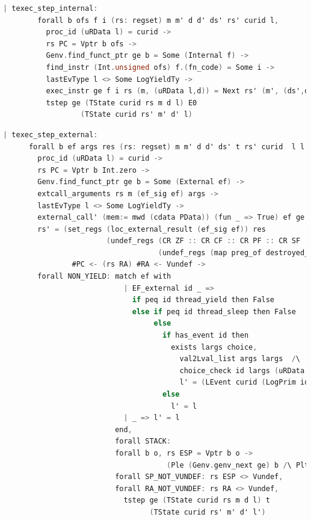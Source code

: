 \begin{lstlisting}[language=C]
    | texec_step_internal:
        forall b ofs f i (rs: regset) m m' d d' ds' rs' curid l,
          proc_id (uRData l) = curid ->
          rs PC = Vptr b ofs ->
          Genv.find_funct_ptr ge b = Some (Internal f) ->
          find_instr (Int.unsigned ofs) f.(fn_code) = Some i ->
          lastEvType l <> Some LogYieldTy ->
          exec_instr ge f i rs (m, (uRData l,d)) = Next rs' (m', (ds',d')) ->
          tstep ge (TState curid rs m d l) E0
                  (TState curid rs' m' d' l)
\end{lstlisting}

\begin{lstlisting}[language=C]
  | texec_step_external:
      forall b ef args res (rs: regset) m m' d d' ds' t rs' curid  l l',
        proc_id (uRData l) = curid ->
        rs PC = Vptr b Int.zero ->
        Genv.find_funct_ptr ge b = Some (External ef) ->
        extcall_arguments rs m (ef_sig ef) args ->
        lastEvType l <> Some LogYieldTy ->
        external_call' (mem:= mwd (cdata PData)) (fun _ => True) ef ge args (m, (uRData l, d)) t res (m', (ds',d')) ->
        rs' = (set_regs (loc_external_result (ef_sig ef)) res 
                        (undef_regs (CR ZF :: CR CF :: CR PF :: CR SF :: CR OF :: nil)
                                    (undef_regs (map preg_of destroyed_at_call) rs))) 
                #PC <- (rs RA) #RA <- Vundef ->
        forall NON_YIELD: match ef with
                            | EF_external id _ => 
                              if peq id thread_yield then False
                              else if peq id thread_sleep then False
                                   else
                                     if has_event id then
                                       exists largs choice,
                                         val2Lval_list args largs  /\
                                         choice_check id largs (uRData l) d = choice /\ 
                                         l' = (LEvent curid (LogPrim id largs choice (snap_func d)) :: l) 
                                     else
                                       l' = l
                            | _ => l' = l
                          end,
                          forall STACK:
                          forall b o, rs ESP = Vptr b o ->
                                      (Ple (Genv.genv_next ge) b /\ Plt b (Mem.nextblock m)),
                          forall SP_NOT_VUNDEF: rs ESP <> Vundef,
                          forall RA_NOT_VUNDEF: rs RA <> Vundef,
                            tstep ge (TState curid rs m d l) t 
                                  (TState curid rs' m' d' l')
\end{lstlisting}

